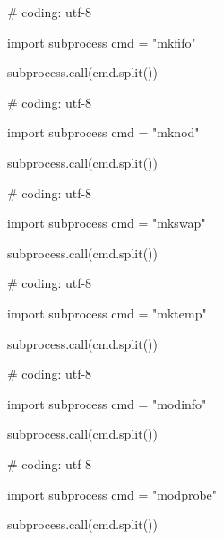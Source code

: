 \begin{mylisting}[label={lst:acpid},language=sh,caption=mkfifo]

# coding: utf-8

import subprocess
cmd = "mkfifo"

subprocess.call(cmd.split())

\end{mylisting}

\begin{mylisting}[label={lst:acpid},language=sh,caption=mknod]

# coding: utf-8

import subprocess
cmd = "mknod"

subprocess.call(cmd.split())

\end{mylisting}

\begin{mylisting}[label={lst:acpid},language=sh,caption=mkswap]

# coding: utf-8

import subprocess
cmd = "mkswap"

subprocess.call(cmd.split())

\end{mylisting}

\begin{mylisting}[label={lst:acpid},language=sh,caption=mktemp]

# coding: utf-8

import subprocess
cmd = "mktemp"

subprocess.call(cmd.split())

\end{mylisting}

\begin{mylisting}[label={lst:acpid},language=sh,caption=modinfo]

# coding: utf-8

import subprocess
cmd = "modinfo"

subprocess.call(cmd.split())

\end{mylisting}

\begin{mylisting}[label={lst:acpid},language=sh,caption=modprobe]

# coding: utf-8

import subprocess
cmd = "modprobe"

subprocess.call(cmd.split())

\end{mylisting}

